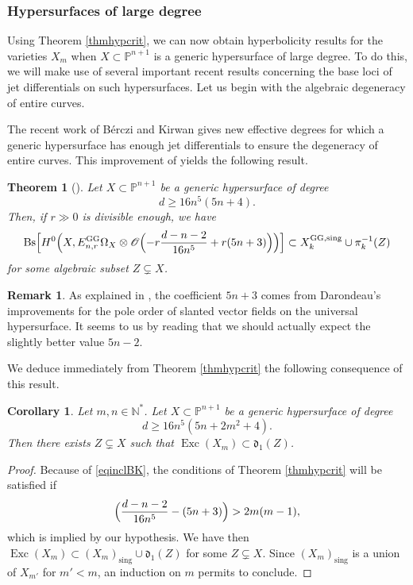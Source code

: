 \documentclass[JEP,XML,SOM,Unicode, NoEqCountersInSection,NoFloatCountersInSection,published]{cedram}
\let\mathcal\mathscr
\newcommand{\rGG}{\mathrm{GG}}
\newcommand{\sing}{\mathrm{sing}}
\DeclareMathOperator{\Bs}{Bs}
\DeclareMathOperator{\Exc}{Exc}
\theoremstyle{theorem}
\newtheorem{theorem}{Theorem}
\newtheorem{corollary}[proposition]{Corollary}
\theoremstyle{definition}
\newtheorem{remark}[proposition]{Remark}
\begin{document}

\subsubsection{Hypersurfaces of large degree}

Using Theorem \ref{thmhypcrit}, we can now obtain hyperbolicity results for the varieties $X_m$ when $X \subset \mathbb P^{n+1}$ is a generic hypersurface of large degree. To do this, we will make use of several important recent results concerning the base loci of jet differentials on such hypersurfaces. Let us begin with the algebraic degeneracy of entire curves.

The recent work of Bérczi and Kirwan \cite{BK19} gives new effective degrees for which a generic hypersurface has enough jet differentials to ensure the degeneracy of entire curves. This improvement of \cite{DMR10} yields the following result.

\begin{theorem}[\cite{BK19}] \label{thmalgdeg} Let $X \subset \mathbb P^{n+1}$ be a generic hypersurface of degree
\[
d \geq 16 n^5 (5n + 4).
\]
Then, if $r \gg 0$ is divisible enough, we have
\begin{equation}\label{eqinclBK}
\Bs \Bigl[ H^0\Bigl(X, E_{n,r}^{\rGG} \Omega_X \otimes \mathcal O \Bigl( -r \frac{d - n - 2}{16n^5} + r (5n+3) \Bigr) \Bigr) \Bigr] \subset X_{k}^{\rGG, \sing} \cup \pi_k^{-1}(Z)
\end{equation}
for some algebraic subset $Z \subsetneq X$.
\end{theorem}
\begin{remark}
As explained in \cite{BK19}, the coefficient $5n+3$ comes from Darondeau's improvements \cite{dar16} for the pole order of slanted vector fields on the universal hypersurface. It seems to us by reading \cite{dar16} that we should actually expect the slightly better value $5n - 2$.
\end{remark}

We deduce immediately from Theorem \ref{thmhypcrit} the following consequence of this result.

\begin{corollary}
Let $m, n \in \mathbb N^\ast$. Let $X \subset \mathbb P^{n + 1}$ be a generic hypersurface of degree
\[
d \geq 16n^5 (5n + 2m^2 + 4).
\]
Then there exists $Z \subsetneq X$ such that $\Exc(X_m) \subset \mathfrak{d}_1 (Z)$.
\end{corollary}
\begin{proof}
Because of \eqref{eqinclBK}, the conditions of Theorem \ref{thmhypcrit} will be satisfied if
\[
\Bigl( \frac{d - n - 2}{16n^5} - (5n + 3) \Bigr) > 2m (m-1),
\]
which is implied by our hypothesis. We have then $\Exc(X_m) \subset (X_m)_{\sing} \cup \mathfrak{d}_1(Z)$ for some $Z \subsetneq X$. Since $(X_m)_{\sing}$ is a union of $X_{m'}$ for $m' < m$, an induction on $m$ permits to conclude.
\end{proof}
\end{document}
